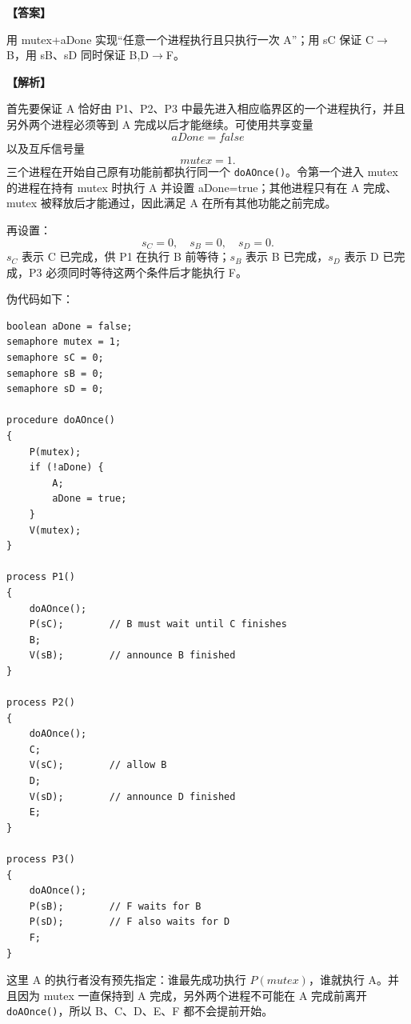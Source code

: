 \documentclass[UTF8,12pt]{ctexart}
\newenvironment{explanation}{\par\noindent\textbf{【解析】}\par\smallskip}{\par\medskip}
\newenvironment{answer}{\par\noindent\textbf{【答案】}\par\smallskip}{\par}
\begin{document}
\begin{answer}
用 mutex+aDone 实现“任意一个进程执行且只执行一次 A”；用 sC 保证 C$\to$B，用 sB、sD 同时保证 B,D$\to$F。
\end{answer}

\begin{explanation}
首先要保证 A 恰好由 P1、P2、P3 中最先进入相应临界区的一个进程执行，并且另外两个进程必须等到 A 完成以后才能继续。可使用共享变量
\[
aDone=false
\]
以及互斥信号量
\[
mutex=1.
\]
三个进程在开始自己原有功能前都执行同一个 \texttt{doAOnce()}。令第一个进入 mutex 的进程在持有 mutex 时执行 A 并设置 aDone=true；其他进程只有在 A 完成、mutex 被释放后才能通过，因此满足 A 在所有其他功能之前完成。

再设置：
\[
s_C=0,\quad s_B=0,\quad s_D=0.
\]
$s_C$ 表示 C 已完成，供 P1 在执行 B 前等待；$s_B$ 表示 B 已完成，$s_D$ 表示 D 已完成，P3 必须同时等待这两个条件后才能执行 F。

伪代码如下：

\begin{lstlisting}
boolean aDone = false;
semaphore mutex = 1;
semaphore sC = 0;
semaphore sB = 0;
semaphore sD = 0;

procedure doAOnce()
{
    P(mutex);
    if (!aDone) {
        A;
        aDone = true;
    }
    V(mutex);
}

process P1()
{
    doAOnce();
    P(sC);        // B must wait until C finishes
    B;
    V(sB);        // announce B finished
}

process P2()
{
    doAOnce();
    C;
    V(sC);        // allow B
    D;
    V(sD);        // announce D finished
    E;
}

process P3()
{
    doAOnce();
    P(sB);        // F waits for B
    P(sD);        // F also waits for D
    F;
}
\end{lstlisting}

这里 A 的执行者没有预先指定：谁最先成功执行 $P(mutex)$，谁就执行 A。并且因为 mutex 一直保持到 A 完成，另外两个进程不可能在 A 完成前离开 \texttt{doAOnce()}，所以 B、C、D、E、F 都不会提前开始。
\end{explanation}
\end{document}

